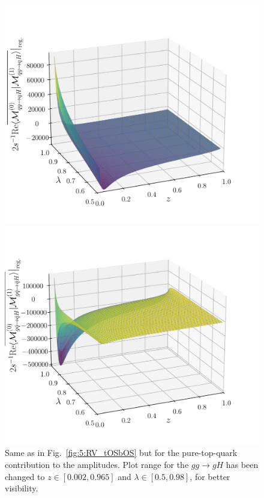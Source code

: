 \begin{figure}[ht]
\begin{minipage}[t]{0.49\textwidth}
  \end{minipage}
  \begin{minipage}[t]{0.49\textwidth}
  \centering
  \includegraphics[width=\textwidth]{Images/RV_amplitudes/tOStOS_qg.pdf}
  \end{minipage}
  \begin{minipage}[t]{0.49\textwidth}
  \centering
  \includegraphics[width=\textwidth]{Images/RV_amplitudes/tOStOS_gqB.pdf}
  \end{minipage}
  \caption{Same as in Fig.~\ref{fig:5:RV_tOSbOS} but for the pure-top-quark contribution to the amplitudes. Plot range for the $g g \rightarrow g H$ has been changed to $z \in [0.002, 0.965]$ and $\lambda \in [0.5, 0.98]$, for better visibility.}
  \label{fig:5:RV_tOStOS}
\end{figure}
